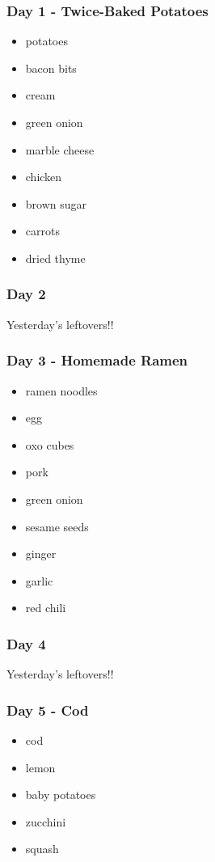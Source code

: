 \documentclass[11pt, a4paper]{article}
\begin{document}
\subsubsection{Day 1 - Twice-Baked Potatoes}
\vspace{1pc}
\begin{itemize}
\item potatoes
\item bacon bits
\item cream
\item green onion
\item marble cheese
\item chicken
\item brown sugar
\item carrots
\item dried thyme
\end{itemize}

\subsubsection{Day 2}
\vspace{1pc}
Yesterday's leftovers!!

\subsubsection{Day 3 - Homemade Ramen}
\vspace{1pc}
\begin{itemize}
\item ramen noodles
\item egg
\item oxo cubes
\item pork
\item green onion
\item sesame seeds
\item ginger
\item garlic
\item red chili
\end{itemize}

\subsubsection{Day 4}
\vspace{1pc}
Yesterday's leftovers!!

\subsubsection{Day 5 - Cod}
\vspace{1pc}
\begin{itemize}
\item cod
\item lemon
\item baby potatoes
\item zucchini
\item squash
\end{itemize}
\end{document}
